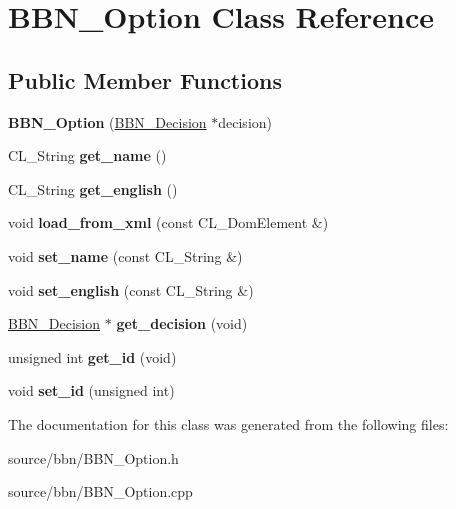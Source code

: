 \hypertarget{classBBN__Option}{
\section{BBN\_\-Option Class Reference}
\label{classBBN__Option}
}
\subsection*{Public Member Functions}
\begin{DoxyCompactItemize}
\item 
\hypertarget{classBBN__Option_a7d3c592f0e930a3730009ab76a133a58}{
{\bfseries BBN\_\-Option} (\hyperlink{classBBN__Decision}{BBN\_\-Decision} $\ast$decision)}
\label{classBBN__Option_a7d3c592f0e930a3730009ab76a133a58}

\item 
\hypertarget{classBBN__Option_a07059badc53fa1c1c0cf581f71fdea9a}{
CL\_\-String {\bfseries get\_\-name} ()}
\label{classBBN__Option_a07059badc53fa1c1c0cf581f71fdea9a}

\item 
\hypertarget{classBBN__Option_ad58c65fd1a59452889f58a5903c49f1f}{
CL\_\-String {\bfseries get\_\-english} ()}
\label{classBBN__Option_ad58c65fd1a59452889f58a5903c49f1f}

\item 
\hypertarget{classBBN__Option_a4d32641c550daa97502bd1be59e2f822}{
void {\bfseries load\_\-from\_\-xml} (const CL\_\-DomElement \&)}
\label{classBBN__Option_a4d32641c550daa97502bd1be59e2f822}

\item 
\hypertarget{classBBN__Option_a33902b855335cc27be5cbb46031c0798}{
void {\bfseries set\_\-name} (const CL\_\-String \&)}
\label{classBBN__Option_a33902b855335cc27be5cbb46031c0798}

\item 
\hypertarget{classBBN__Option_ae2b19529446608540ce345ae637773e7}{
void {\bfseries set\_\-english} (const CL\_\-String \&)}
\label{classBBN__Option_ae2b19529446608540ce345ae637773e7}

\item 
\hypertarget{classBBN__Option_a39e4b7ee59740fbeba7d868fd5af7c09}{
\hyperlink{classBBN__Decision}{BBN\_\-Decision} $\ast$ {\bfseries get\_\-decision} (void)}
\label{classBBN__Option_a39e4b7ee59740fbeba7d868fd5af7c09}

\item 
\hypertarget{classBBN__Option_adda8594719187ef052b8a82d36c97122}{
unsigned int {\bfseries get\_\-id} (void)}
\label{classBBN__Option_adda8594719187ef052b8a82d36c97122}

\item 
\hypertarget{classBBN__Option_a0462902d81e87603e070d3d8f41e67d1}{
void {\bfseries set\_\-id} (unsigned int)}
\label{classBBN__Option_a0462902d81e87603e070d3d8f41e67d1}

\end{DoxyCompactItemize}


The documentation for this class was generated from the following files:\begin{DoxyCompactItemize}
\item 
source/bbn/BBN\_\-Option.h\item 
source/bbn/BBN\_\-Option.cpp\end{DoxyCompactItemize}
